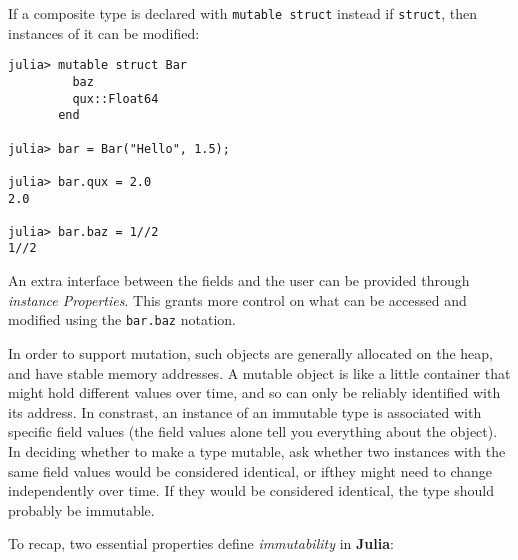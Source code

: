 \documentclass[
]{article}
\begin{document}
If a composite type is declared with \texttt{mutable\ struct} instead if
\texttt{struct}, then instances of it can be modified:

\begin{verbatim}
julia> mutable struct Bar
         baz
         qux::Float64
       end

julia> bar = Bar("Hello", 1.5);

julia> bar.qux = 2.0
2.0

julia> bar.baz = 1//2
1//2
\end{verbatim}

An extra interface between the fields and the user can be provided
through \emph{instance Properties}. This grants more control on what can
be accessed and modified using the \texttt{bar.baz} notation.

In order to support mutation, such objects are generally allocated on
the heap, and have stable memory addresses. A mutable object is like a
little container that might hold different values over time, and so can
only be reliably identified with its address. In constrast, an instance
of an immutable type is associated with specific field values (the field
values alone tell you everything about the object). In deciding whether
to make a type mutable, ask whether two instances with the same field
values would be considered identical, or ifthey might need to change
independently over time. If they would be considered identical, the type
should probably be immutable.

To recap, two essential properties define \emph{immutability} in
\textbf{Julia}:
\end{document}
